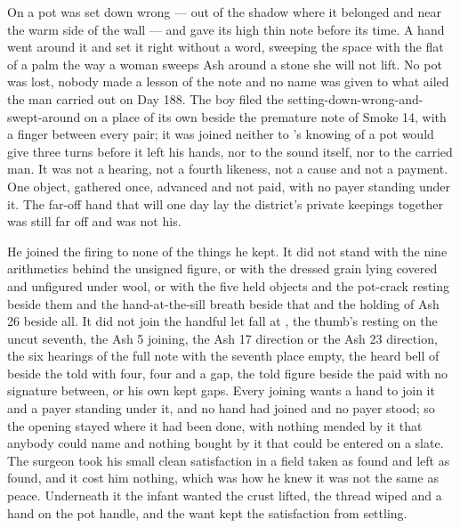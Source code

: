 On  a pot was set down wrong --- out of the shadow where it belonged and near the warm side of the wall --- and gave its high thin note before its time. A hand went around it and set it right without a word, sweeping the space with the flat of a palm the way a woman sweeps Ash around a stone she will not lift. No pot was lost, nobody made a lesson of the note and no name was given to what ailed the man carried out on Day 188. The boy filed the setting-down-wrong-and-swept-around on a place of its own beside the premature note of Smoke 14, with a finger between every pair; it was joined neither to 's knowing of  a pot would give three turns before it left his hands, nor to the sound itself, nor to the carried man. It was not a hearing, not a fourth likeness, not a cause and not a payment. One object, gathered once, advanced and not paid, with no payer standing under it. The far-off hand that will one day lay the district's private keepings together was still far off and was not his.

He joined the firing to none of the things he kept. It did not stand with the nine arithmetics behind the unsigned figure, or with the dressed grain lying covered and unfigured under wool, or with the five held objects and the pot-crack resting beside them and the hand-at-the-sill breath beside that and the holding of Ash 26 beside all. It did not join the handful let fall at , the thumb's resting on the uncut seventh, the Ash 5 joining, the Ash 17 direction or the Ash 23 direction, the six hearings of the full note with the seventh place empty, the heard bell of  beside the told with four, four and a gap, the told figure beside the paid with no signature between, or his own kept gaps. Every joining wants a hand to join it and a payer standing under it, and no hand had joined and no payer stood; so the opening stayed where it had been done, with nothing mended by it that anybody could name and nothing bought by it that could be entered on a slate. The surgeon took his small clean satisfaction in a field taken as found and left as found, and it cost him nothing, which was how he knew it was not the same as peace. Underneath it the infant wanted the crust lifted, the thread wiped and a hand on the pot handle, and the want kept the satisfaction from settling.

\scenebreak

